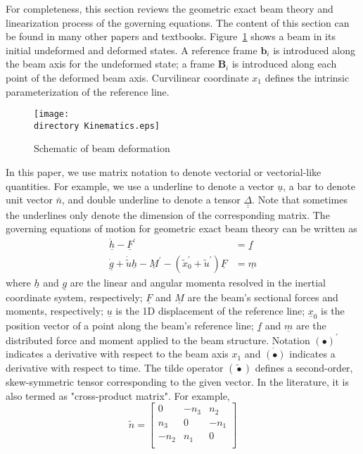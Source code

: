 \documentclass{aiaa-tc}
\def\directory{EPSF/}
\renewcommand{\vec}[1]{\underline{#1}}
\renewcommand{\skew}[1]{\widetilde{#1}}
\begin{document}
For completeness, this section reviews the geometric exact beam theory and
linearization process of the governing equations. The content of this
section can be found in many other papers and textbooks.
Figure~\ref{Kinematics} shows a beam in its initial undeformed and deformed
states. A reference frame $\mathbf{b}_i$ is introduced along the beam axis
for the undeformed state; a frame $\mathbf{B}_i$ is introduced along each
point of the deformed beam axis. Curvilinear coordinate $x_1$ defines the
intrinsic parameterization of the reference line.
\begin{figure}
\centering
\texttt{[image: \\directory Kinematics.eps]}
\caption{Schematic of beam deformation} \label{Kinematics}
\end{figure}
In this paper, we use matrix notation to denote vectorial or vectorial-like
quantities. For example, we use a underline to denote a vector
$\underline{u}$, a bar to denote unit vector $\bar{n}$, and double underline
to denote a tensor $\underline{\underline{\Delta}}$. Note that sometimes the
underlines only denote the dimension of the corresponding matrix. The
governing equations of motion for geometric exact beam theory can be written
as\cite{Bauchau:2010}
\begin{align}
	\label{GovernGEBT-1}
	\dot{\underline{h}} - \underline{F}^\prime &= \underline{f} \\
	\label{GovernGEBT-2}
	\dot{\underline{g}} + \dot{\tilde{u}} \underline{h} - \underline{M}^\prime - (\tilde{x}_0^\prime + \tilde{u}^\prime) \underline{F} &= \underline{m}
\end{align}
where $\vec{h}$ and $\vec{g}$ are the linear and angular momenta resolved in
the inertial coordinate system, respectively; $\vec{F}$ and $\vec{M}$ are
the beam's sectional forces and moments, respectively; $\vec{u}$ is the 1D
displacement of the reference line; $\vec{x}_0$ is the position vector of a
point along the beam's reference line; $\vec{f}$ and $\vec{m}$ are the
distributed force and moment applied to the beam structure.  Notation
$(\bullet)^\prime$ indicates a derivative with respect to the beam axis
$x_1$ and $\dot{(\bullet)}$ indicates a derivative with respect to time. The
tilde operator $(\skew{\bullet})$ defines a second-order, skew-symmetric
tensor corresponding to the given vector. In the literature, it is also
termed as "cross-product matrix". For example,
\[
	\skew{n} = 
	     		\begin{bmatrix}
			0 & -n_3 & n_2 \\
			n_3 & 0 & -n_1 \\
			-n_2 & n_1 & 0\\
			\end{bmatrix}	
\]
\end{document}
